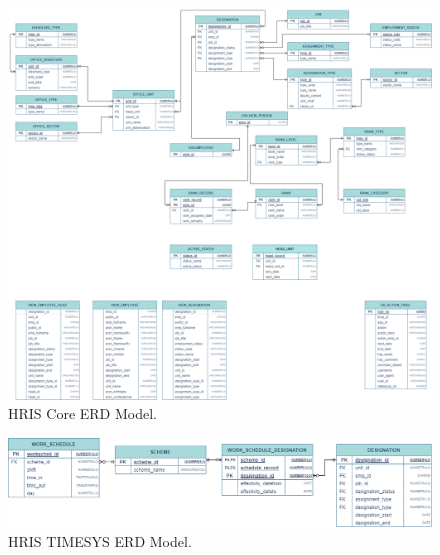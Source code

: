     \begin{figure}[H]
        \centering
        \includegraphics[width=1\linewidth]{figures/images/erd-hris.png}
        \caption{HRIS Core ERD Model.}
        \label{fig:erd-hris}
    \end{figure}

    \begin{figure}[H]
        \centering
        \includegraphics[width=1\linewidth]{figures/images/erd-timesys.png}
        \caption{HRIS TIMESYS ERD Model.}
        \label{fig:erd-timesys}
    \end{figure}

